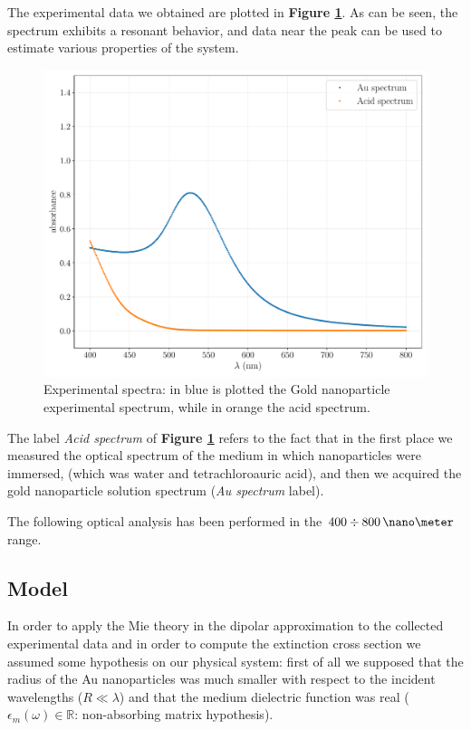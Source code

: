 \documentclass[twocolumn]{article}
\begin{document}
\begin{multicols}{2}
The experimental data we obtained are plotted in \textbf{Figure \ref{fig:exp_data}}. As can be seen, the spectrum exhibits a resonant behavior, and data near the peak can be used to estimate various properties of the system.

\begin{figure}[H]
    \centering
    \includegraphics[width=\linewidth]{image/data/exp_data.pdf}
    \caption{Experimental spectra: in blue is plotted the Gold nanoparticle experimental spectrum, while in orange the acid spectrum.}
    \label{fig:exp_data}
\end{figure}

The label \textit{Acid spectrum} of \textbf{Figure \ref{fig:exp_data}} refers to the fact that in the first place we measured the optical spectrum of the medium in which nanoparticles were immersed, (which was water and tetrachloroauric acid),  and then we acquired the gold
nanoparticle solution spectrum (\textit{Au spectrum} label).

The following optical analysis has been performed in the $400 \div 800\,\nano\meter$ range.

\subsection{Model}
In order to apply the Mie theory in the dipolar approximation to the collected experimental data and in order to compute the extinction cross section we assumed some hypothesis on our physical system: first of all we supposed that the radius of the Au nanoparticles was much smaller with respect to the incident wavelengths ($R\ll \lambda$) and that the medium dielectric function was real ($\epsilon_m(\omega) \in \mathbb{R}$: non-absorbing matrix hypothesis). 


\end{multicols}
\end{document}
